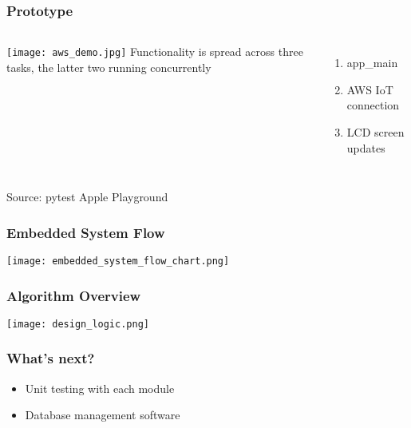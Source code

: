 \documentclass{beamer}
\begin{document}
\begin{frame}
  \frametitle{Prototype}
  \begin{columns}
    \texttt{[image: aws\_demo.jpg]}
    Functionality is spread across three tasks, the latter two running concurrently
    \begin{enumerate}
      \item app\_main
      \item AWS IoT connection
      \item LCD screen updates
    \end{enumerate}
  \end{columns}
  \hfill {\tiny Source: pytest Apple Playground}

\end{frame}

\begin{frame}
  \frametitle{Embedded System Flow}
  \texttt{[image: embedded\_system\_flow\_chart.png]}
\end{frame}

\begin{frame}
  \frametitle{Algorithm Overview}
  \texttt{[image: design\_logic.png]}
\end{frame}

\begin{frame}
  \frametitle{What's next?}
  \begin{itemize}
    \item Unit testing with each module
    \item Database management software
  \end{itemize}
\end{frame}
\end{document}

